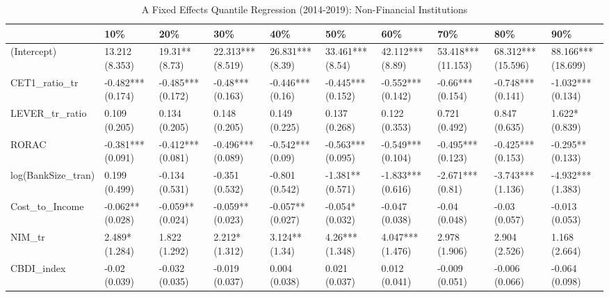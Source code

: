 \begin{table}[ht]
\centering
\caption{A Fixed Effects Quantile Regression (2014-2019): Non-Financial Institutions} 
\begingroup\small
\begin{tabular}{llllllllll}
  \toprule
 & 10\% & 20\% & 30\% & 40\% & 50\% & 60\% & 70\% & 80\% & 90\% \\ 
  \midrule
(Intercept) & 13.212 (8.353) & 19.31** (8.73) & 22.313*** (8.519) & 26.831*** (8.39) & 33.461*** (8.54) & 42.112*** (8.89) & 53.418*** (11.153) & 68.312*** (15.596) & 88.166*** (18.699) \\ 
  CET1\_ratio\_tr & -0.482*** (0.174) & -0.485*** (0.172) & -0.48*** (0.163) & -0.446*** (0.16) & -0.445*** (0.152) & -0.552*** (0.142) & -0.66*** (0.154) & -0.748*** (0.141) & -1.032*** (0.134) \\ 
  LEVER\_tr\_ratio & 0.109 (0.205) & 0.134 (0.205) & 0.148 (0.205) & 0.149 (0.225) & 0.137 (0.268) & 0.122 (0.353) & 0.721 (0.492) & 0.847 (0.635) & 1.622* (0.839) \\ 
  RORAC & -0.381*** (0.091) & -0.412*** (0.081) & -0.496*** (0.089) & -0.542*** (0.09) & -0.563*** (0.095) & -0.549*** (0.104) & -0.495*** (0.123) & -0.425*** (0.153) & -0.295** (0.133) \\ 
  log(BankSize\_tran) & 0.199 (0.499) & -0.134 (0.531) & -0.351 (0.532) & -0.801 (0.542) & -1.381** (0.571) & -1.833*** (0.616) & -2.671*** (0.81) & -3.743*** (1.136) & -4.932*** (1.383) \\ 
  Cost\_to\_Income & -0.062** (0.028) & -0.059** (0.024) & -0.059** (0.023) & -0.057** (0.027) & -0.054* (0.032) & -0.047 (0.038) & -0.04 (0.048) & -0.03 (0.057) & -0.013 (0.053) \\ 
  NIM\_tr & 2.489* (1.284) & 1.822 (1.292) & 2.212* (1.312) & 3.124** (1.34) & 4.26*** (1.348) & 4.047*** (1.476) & 2.978 (1.906) & 2.904 (2.526) & 1.168 (2.664) \\ 
  CBDI\_index & -0.02 (0.039) & -0.032 (0.035) & -0.019 (0.037) & 0.004 (0.038) & 0.021 (0.037) & 0.012 (0.041) & -0.009 (0.051) & -0.006 (0.066) & -0.064 (0.098) \\ 
   \bottomrule
\end{tabular}
\endgroup
\end{table}
